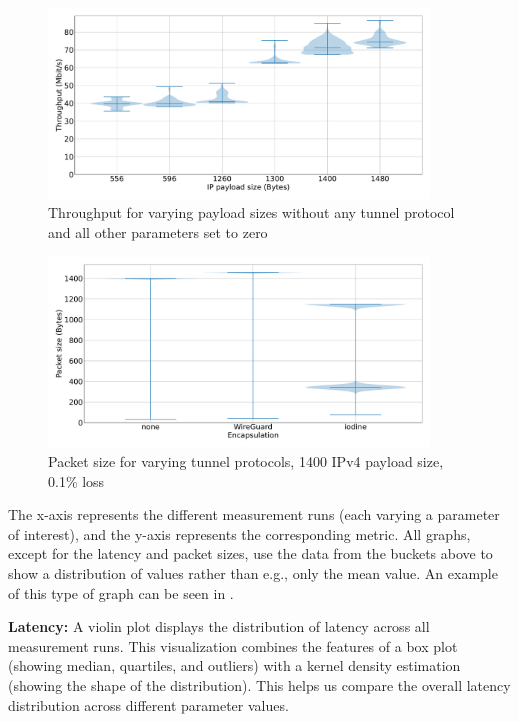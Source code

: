 \begin{figure}[tbh]
	\centering
	\includegraphics[draft=false,width=0.9\textwidth]{figures/Graphs/graph-4-mtu/throughput.pdf}
	\caption{Throughput for varying payload sizes without any tunnel protocol and all other parameters set to zero}
	\label{fig:graph-4-mtu-throughput}
\end{figure}

\begin{figure}[tbh]
	\centering
	\includegraphics[draft=false,width=0.9\textwidth]{figures/Graphs/graph-6-three-protocols/packet_size.pdf}
	\caption{Packet size for varying tunnel protocols, 1400 IPv4 payload size, 0.1\% loss}
	\label{fig:graph-6-three-protocols-size}
\end{figure}

The x-axis represents the different measurement runs (each varying a parameter of interest), and the y-axis represents the corresponding metric.
All graphs, except for the latency and packet sizes, use the data from the buckets above to show a distribution of values rather than e.g., only the mean value.
An example of this type of graph can be seen in .

\noindent\textbf{Latency:} A violin plot displays the distribution of latency across all measurement runs.
This visualization combines the features of a box plot (showing median, quartiles, and outliers) with a kernel density estimation (showing the shape of the distribution).
This helps us compare the overall latency distribution across different parameter values.

